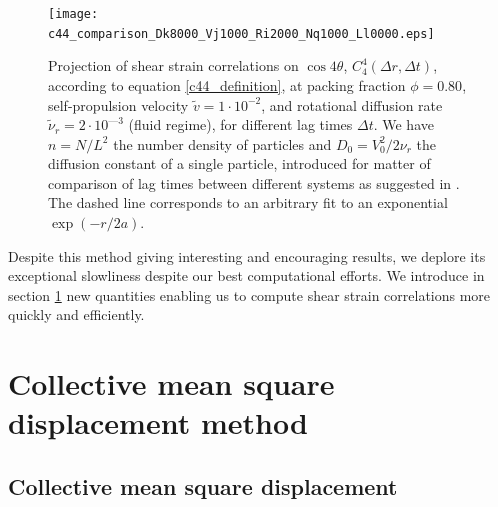 \documentclass[class=report, float=false, crop=false]{standalone}
\begin{document}
\begin{figure}[H]
\centering
\texttt{[image: c44\_comparison\_Dk8000\_Vj1000\_Ri2000\_Nq1000\_Ll0000.eps]}
\caption{Projection of shear strain correlations on $\cos4\theta$, $C_4^4(\Delta r, \Delta t)$, according to equation \ref{c44_definition}, at packing fraction $\phi = 0.80$, self-propulsion velocity $\tilde{v} = 1\cdot10^{-2}$, and rotational diffusion rate $\tilde{\nu}_r = 2\cdot10^{—3}$ (fluid regime), for different lag times $\Delta t$. We have $n = N/L^2$ the number density of particles and $D_0 = V_0^2/2\nu_r$ the diffusion constant of a single particle, introduced for matter of comparison of lag times between different systems as suggested in \cite{illing2016strain}. The dashed line corresponds to an arbitrary fit to an exponential $\exp(-r/2a)$.}
\label{c44_real_fluid}
\end{figure}


Despite this method giving interesting and encouraging results, we deplore its exceptional slowliness despite our best computational efforts. We introduce in section \ref{section:collective_mean_square_displacement_method} new quantities enabling us to compute shear strain correlations more quickly and efficiently.

\section{Collective mean square displacement method}
\label{section:collective_mean_square_displacement_method}

\subsection{Collective mean square displacement}
\label{subsection:cmsd}

\end{document}
